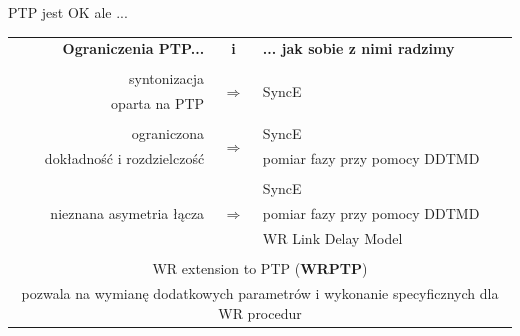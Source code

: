 \documentclass[compress,red]{beamer}
\begin{document}
\begin{frame}{PTP jest OK ale ...}

  \resizebox{11cm}{!} 
  {
    \begin{tabular}{ r c l }
  {\bf Ograniczenia PTP...} 	& {\bf i}      & {\bf ... jak sobie z nimi radzimy}  \\
				&     		 &        \\
      syntonizacja	 	& \multirow{2}{*}{$\Rightarrow$}  & \multirow{2}{*}{SyncE }\\
      oparta na PTP	        &      		 &        \\
				&      		 &        			\\
      ograniczona             	&\multirow{2}{*}{$\Rightarrow$}  	 & SyncE \\
      dokładność i rozdzielczość&      		 & pomiar fazy przy pomocy DDTMD\\
				&    		 &        \\
			        &      		 & SyncE  \\
      nieznana asymetria łącza  & $\Rightarrow$  & pomiar fazy przy pomocy DDTMD \\
				&      		 & WR Link Delay Model \\
				&      		 &        \\
      \multicolumn{3}{c}{WR extension to PTP ({\bf WRPTP})  } \\
      \multicolumn{3}{c}{pozwala na wymianę dodatkowych parametrów i wykonanie specyficznych dla WR procedur} \\
    \end{tabular}
  }
\end{frame}
% 
% 
\end{document}
